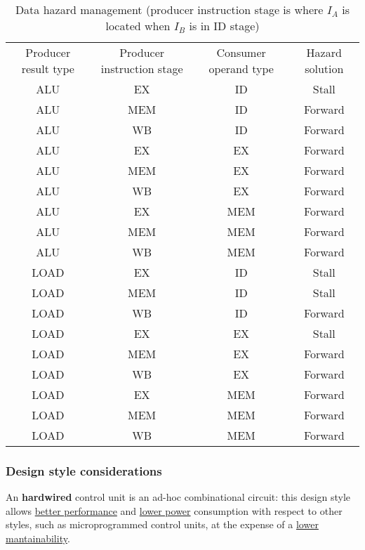 \begin{table}[H]
	\centering
	\begin{tabular}{cccc}
		\hline
		\rowcolor{gray!50}
		Producer result type & Producer instruction stage &
			Consumer operand type & Hazard solution \\
		ALU &	EX &	ID &	Stall \\
		\rowcolor{gray!25}
		ALU &	MEM &	ID &	Forward \\
		ALU &	WB &	ID &	Forward \\
		\hdashline
		\rowcolor{gray!25}
		ALU & 	EX &	EX &	Forward \\
		ALU & 	MEM &	EX &	Forward \\
		\rowcolor{gray!25}
		ALU & 	WB &	EX &	Forward \\
		\hdashline
		ALU & 	EX &	MEM &	Forward \\
		\rowcolor{gray!25}
		ALU & 	MEM &	MEM &	Forward \\
		ALU & 	WB &	MEM &	Forward \\
		\hdashline
		\rowcolor{gray!25}
		LOAD & 	EX &	ID &	Stall \\
		LOAD & 	MEM &	ID &	Stall \\
		\rowcolor{gray!25}
		LOAD & 	WB &	ID &	Forward \\
		\hdashline
		LOAD & 	EX &	EX &	Stall \\
		\rowcolor{gray!25}
		LOAD & 	MEM &	EX &	Forward \\
		LOAD & 	WB &	EX &	Forward \\
		\hdashline
		\rowcolor{gray!25}
		LOAD & 	EX &	MEM &	Forward \\
		LOAD & 	MEM &	MEM &	Forward \\
		\rowcolor{gray!25}
		LOAD & 	WB &	MEM &	Forward \\
		\hline
	\end{tabular}
	\caption{Data hazard management (producer instruction stage is where
		$I_A$ is located when $I_B$ is in ID stage)}
	\label{tab:data_hazard}
\end{table}

\subsubsection{Design style considerations}
An \textbf{hardwired} control unit is an ad-hoc combinational circuit:
this design style allows \underline{better performance} and \underline{lower power}
consumption with respect to other styles, such as microprogrammed control units,
at the expense of a \underline{lower mantainability}.

